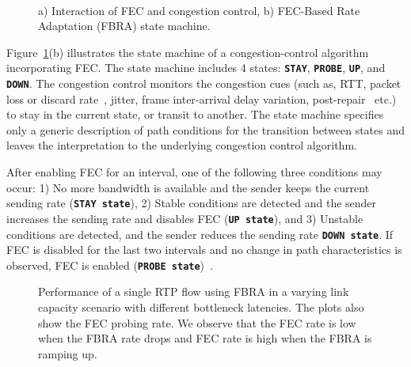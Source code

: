 \begin{figure}
  \centering
   \\
\caption{a) Interaction of FEC and congestion control, b) FEC-Based Rate
Adaptation (FBRA) state machine.}
\label{fig:fecrc-intro}
\end{figure}


Figure~\ref{fig:fecrc-intro}(b) illustrates the state machine of a
congestion-control algorithm incorporating FEC. The state machine includes 4
states: \texttt{\textbf{STAY}}, \texttt{\textbf{PROBE}}, \texttt{\textbf{UP}},
and \texttt{\textbf{DOWN}}. The congestion control monitors the congestion
cues (such as, RTT, packet loss or discard rate~\cite{rfc7002, rfc7097, rfc7243}, jitter, frame inter-arrival
delay variation, post-repair~\cite{rfc5725, draft.xr.post.repair} etc.) to stay in the current state, or transit to
another. The state machine specifies only a generic description of path
conditions for the transition between states and leaves the interpretation to
the underlying congestion control algorithm.

After enabling FEC for an interval, one of the following three conditions may
occur: 1) No more bandwidth is available and the sender keeps the current sending
rate (\texttt{\textbf{STAY state}}), 2) Stable conditions are detected and the
sender increases the sending rate and disables FEC (\texttt{\textbf{UP
state}}), and 3) Unstable conditions are detected, and the sender reduces the
sending rate \texttt{\textbf{DOWN state}}. If FEC is disabled for the last two
intervals and no change in path characteristics is observed, FEC is enabled
(\texttt{\textbf{PROBE state}})~\cite{draft.adaptive.fec}.


\begin{figure}
\caption{Performance of a single RTP flow using FBRA in a
varying link capacity scenario with different bottleneck latencies. The plots
also show the FEC probing rate. We observe that the FEC rate is low when the
FBRA rate drops and FEC rate is high when the FBRA is ramping up.}
\label{fig:fecrc-var}
\end{figure}

